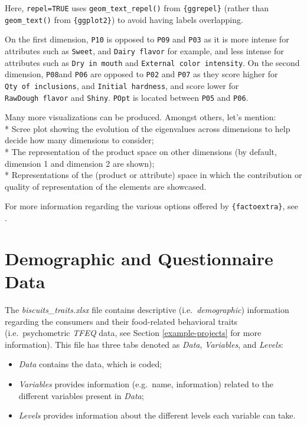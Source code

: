 \documentclass[
]{krantz}
\providecommand{\tightlist}{%
  \setlength{\itemsep}{0pt}\setlength{\parskip}{0pt}}
\renewenvironment{quote}{\begin{VF}}{\end{VF}}
\begin{document}
Here, \texttt{repel=TRUE} uses \texttt{geom\_text\_repel()} from \texttt{\{ggrepel\}} (rather than \texttt{geom\_text()} from \texttt{\{ggplot2\}}) to avoid having labels overlapping.

On the first dimension, \texttt{P10} is opposed to \texttt{P09} and \texttt{P03} as it is more intense for attributes such as \texttt{Sweet}, and \texttt{Dairy\ flavor} for example, and less intense for attributes such as \texttt{Dry\ in\ mouth} and \texttt{External\ color\ intensity}. On the second dimension, \texttt{P08}and \texttt{P06} are opposed to \texttt{P02} and \texttt{P07} as they score higher for \texttt{Qty\ of\ inclusions}, and \texttt{Initial\ hardness}, and score lower for \texttt{RawDough\ flavor} and \texttt{Shiny}. \texttt{POpt} is located between \texttt{P05} and \texttt{P06}.

\begin{quote}
Many more visualizations can be produced. Amongst others, let's mention:\\
* Scree plot showing the evolution of the eigenvalues across dimensions to help decide how many dimensions to consider;\\
* The representation of the product space on other dimensions (by default, dimension 1 and dimension 2 are shown);\\
* Representations of the (product or attribute) space in which the contribution or quality of representation of the elements are showcased.
\end{quote}

For more information regarding the various options offered by \texttt{\{factoextra\}}, see \citet{kassambara2017practical}.

\hypertarget{demographic-and-questionnaire-data}{%
\section{Demographic and Questionnaire Data}\label{demographic-and-questionnaire-data}}

The \emph{biscuits\_traits.xlsx} file contains descriptive (i.e.~\emph{demographic}) information regarding the consumers and their food-related behavioral traits (i.e.~psychometric \emph{TFEQ} data, see Section \ref{example-projects} for more information). This file has three tabs denoted as \emph{Data}, \emph{Variables}, and \emph{Levels}:

\begin{itemize}
\tightlist
\item
  \emph{Data} contains the data, which is coded;
\item
  \emph{Variables} provides information (e.g.~name, information) related to the different variables present in \emph{Data};
\item
  \emph{Levels} provides information about the different levels each variable can take.
\end{itemize}
\end{document}
